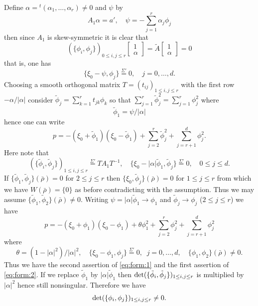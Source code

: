 \documentclass[12pt,leqno]{article} %
\def\al{\alpha}
\def\sieq{\overset{\Sigma'}{=}}
\def\bro{\bar\rho}
\def\bro{\bar\rho}
\numberwithin{equation}{section}
\begin{document}
Define $\al={^t}(\al_1,\ldots,\al_r)\neq 0$ and $\psi$ by
%
\[
A_1\al=a',\quad \psi=-\sum_{j=1}^r\al_j\phi_j
\]
%
then since $A_1$ is skew-symmetric it is clear that 
%
\[
(\{\phi_i,\phi_j\})_{0\leq i,j\leq r}\begin{bmatrix}1\\
\al
\end{bmatrix}=\tilde A\begin{bmatrix}1\\
\al
\end{bmatrix}=0
\]
%
that is, one has 
%
\begin{equation}
\label{eq:0:psi}
\{\xi_0-\psi,\phi_j\}\sieq 0,\quad j=0,\ldots, d.
\end{equation}
%
%
Choosing a smooth orthogonal matrix $T=(t_{ij})_{1\leq i,j\leq r}$ with the first row $-
\al/|\al|$ 
consider ${\tilde \phi_j}=\sum_{k=1}^rt_{jk}\phi_k$ so that $\sum_{j=1}^r{\tilde\phi_j^2}=\sum_{j=1}^r\phi_j^2$ where 
%
\[
{\tilde \phi_1}=\psi/|\al|
\]
%
hence one can write
%
\begin{equation}
\label{eq:zen:form}
p=-(\xi_0+\tilde\phi_1)(\xi_0-\tilde\phi_1)+\sum_{j=2}^r{\tilde\phi_j^2}+\sum_{j=r+1}^d\phi_j^2.
\end{equation}
%
Here note that
%
\[
(\{\tilde\phi_i,\tilde\phi_j\})_{1\leq i,j\leq r}\sieq TA_1T^{-1},\quad \{\xi_0-|\al|\tilde\phi_1, \tilde\phi_j\}\sieq 0,\quad 0\leq j\leq d.
\]
%
If $\{\tilde\phi_1,\tilde\phi_j\}(\bro)=0$ for $2\leq j\leq r$ then $\{\xi_0,\tilde\phi_j\}(\bro)=0$ for $1\leq j\leq r$ from which we have $W(\bro)= \{0\}$ as before contradicting with the assumption. Thus we may assume $\{\tilde\phi_1,\tilde\phi_2\}(\bro)\neq 0$.
Writing $\psi=|\al|\tilde\phi_1\to \phi_1$ and $\tilde\phi_j\to \phi_j$ ($2\leq j\leq r$) we have 
%
\begin{equation}
\label{eq:form:1b}
p=-(\xi_0+\phi_1)(\xi_0-\phi_1)+\theta \phi_1^2+\sum_{j=2}^r\phi_j^2+\sum_{j=r+1}^d\phi_j^2
\end{equation}
%
where
%
\begin{equation}
\label{eq:te:teigi}
\theta=(1-|\al|^2)/|\al|^2,\quad \{\xi_0-\phi_1,\phi_j\}
\sieq 0,\;\;j=0,\ldots,d,\quad \{\phi_1,\phi_2\}(\bro)\neq 0.
\end{equation}
%
%
Thus we have the second assertion of \eqref{eq:form:1} and the first assertion of  \eqref{eq:form:2}.
 If we replace $\tilde\phi_1$ by $|\al|\tilde\phi_1$ then ${\rm det}(\{\tilde\phi_i,\tilde\phi_j\})_{1\leq i,j\leq r}$ is multiplied by $|\al|^2$ hence still 
nonsingular. Therefore we have
%
\[
{\rm det}(\{\phi_i,\phi_j\})_{1\leq i,j\leq r}\neq 0.
\]
\end{document}
